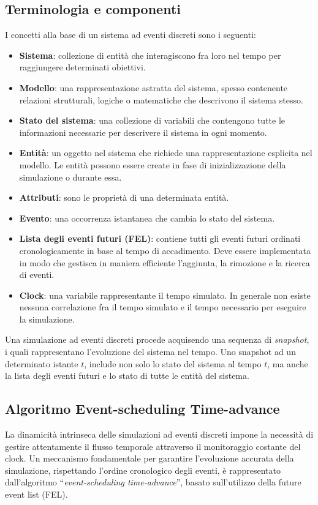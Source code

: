 \documentclass[12pt,a4paper,openright,twoside]{book}
\begin{document}
\subsection{Terminologia e componenti}
I concetti alla base di un sistema ad eventi discreti sono i seguenti: 
\begin{itemize}
    \item \textbf{Sistema}: collezione di entità che interagiscono fra loro nel tempo per raggiungere determinati obiettivi.
    \item \textbf{Modello}: una rappresentazione astratta del sistema, spesso contenente relazioni strutturali, logiche o matematiche che descrivono il sistema stesso.
    \item \textbf{Stato del sistema}: una collezione di variabili che contengono tutte le informazioni necessarie per descrivere il sistema in ogni momento.
    \item \textbf{Entità}: un oggetto nel sistema che richiede una rappresentazione esplicita nel modello. Le entità possono essere create in fase di inizializzazione della simulazione o durante essa. 
    \item \textbf{Attributi}: sono le proprietà di una determinata entità.
    \item \textbf{Evento}: una occorrenza istantanea che cambia lo stato del sistema. 
    \item \textbf{Lista degli eventi futuri (FEL)}: contiene tutti gli eventi futuri ordinati cronologicamente in base al tempo di accadimento. Deve essere implementata in modo che gestisca in maniera efficiente l'aggiunta, la rimozione e la ricerca di eventi. 
    \item \textbf{Clock}: una variabile rappresentante il tempo simulato. In generale non esiste nessuna correlazione fra il tempo simulato e il tempo necessario per eseguire la simulazione. 
\end{itemize}
Una simulazione ad eventi discreti procede acquisendo una sequenza di \textit{snapshot}, i quali rappresentano l'evoluzione del sistema nel tempo. Uno snapshot ad un determinato istante $t$, include non solo lo stato del sistema al tempo $t$, ma anche la lista degli eventi futuri e lo stato di tutte le entità del sistema.

\subsection{Algoritmo Event-scheduling Time-advance}
\label{sec:time-advance-algorithm}
La dinamicità intrinseca delle simulazioni ad eventi discreti impone la necessità di gestire attentamente il flusso temporale attraverso il monitoraggio costante del clock. 
Un meccanismo fondamentale per garantire l'evoluzione accurata della simulazione, rispettando l'ordine cronologico degli eventi, è rappresentato dall'algoritmo ``\textit{event-scheduling time-advance}'', basato sull'utilizzo della future event list (FEL).
\end{document}
